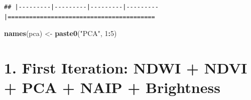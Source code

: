 \documentclass[
]{article}
\newenvironment{Shaded}{\begin{snugshade}}{\end{snugshade}}
\newcommand{\DecValTok}[1]{\textcolor[rgb]{0.00,0.00,0.81}{#1}}
\newcommand{\FunctionTok}[1]{\textcolor[rgb]{0.13,0.29,0.53}{\textbf{#1}}}
\newcommand{\NormalTok}[1]{#1}
\newcommand{\OtherTok}[1]{\textcolor[rgb]{0.56,0.35,0.01}{#1}}
\newcommand{\SpecialCharTok}[1]{\textcolor[rgb]{0.81,0.36,0.00}{\textbf{#1}}}
\newcommand{\StringTok}[1]{\textcolor[rgb]{0.31,0.60,0.02}{#1}}
\begin{document}
\begin{verbatim}
## |---------|---------|---------|---------|=========================================                                          
\end{verbatim}

\begin{Shaded}
\begin{Highlighting}[]
\FunctionTok{names}\NormalTok{(pca) }\OtherTok{\textless{}{-}} \FunctionTok{paste0}\NormalTok{(}\StringTok{"PCA"}\NormalTok{, }\DecValTok{1}\SpecialCharTok{:}\DecValTok{5}\NormalTok{)}
\end{Highlighting}
\end{Shaded}

\section{1. First Iteration: NDWI + NDVI + PCA + NAIP +
Brightness}\label{first-iteration-ndwi-ndvi-pca-naip-brightness}
\end{document}
